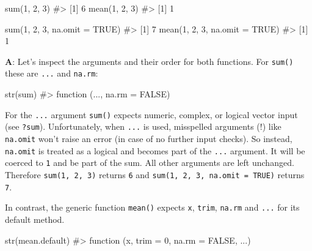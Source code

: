\documentclass[
]{krantz}
\makeatletter
\newenvironment{Shaded}{\begin{snugshade}}{\end{snugshade}}
\newcommand{\CommentTok}[1]{\textcolor[rgb]{0.56,0.35,0.01}{\textit{#1}}}
\newcommand{\DataTypeTok}[1]{\textcolor[rgb]{0.13,0.29,0.53}{#1}}
\newcommand{\DecValTok}[1]{\textcolor[rgb]{0.00,0.00,0.81}{#1}}
\newcommand{\KeywordTok}[1]{\textcolor[rgb]{0.13,0.29,0.53}{\textbf{#1}}}
\newcommand{\NormalTok}[1]{#1}
\newcommand{\OtherTok}[1]{\textcolor[rgb]{0.56,0.35,0.01}{#1}}
\newenvironment{kframe}{%
\medskip{}
\setlength{\fboxsep}{.8em}
 \def\at@end@of@kframe{}%
 \ifinner\ifhmode%
  \def\at@end@of@kframe{\end{minipage}}%
  \begin{minipage}{\columnwidth}%
 \fi\fi%
 \def\FrameCommand##1{\hskip\@totalleftmargin \hskip-\fboxsep
 \colorbox{shadecolor}{##1}\hskip-\fboxsep
     \hskip-\linewidth \hskip-\@totalleftmargin \hskip\columnwidth}%
 \MakeFramed {\advance\hsize-\width
   \@totalleftmargin\z@ \linewidth\hsize
   \@setminipage}}%
 {\par\unskip\endMakeFramed%
 \at@end@of@kframe}
\renewenvironment{Shaded}{\begin{kframe}}{\end{kframe}}
\renewcommand{\KeywordTok} [1]{\textcolor[rgb]{0.00,0.44,0.13}{{#1}}}
\renewcommand{\DataTypeTok}[1]{\textcolor[rgb]{0.56,0.13,0.00}{{#1}}}
\renewcommand{\DecValTok}  [1]{\textcolor[rgb]{0.25,0.63,0.44}{{#1}}}
\renewcommand{\CommentTok} [1]{\textcolor[rgb]{0.38,0.63,0.69}{{#1}}}
\renewcommand{\OtherTok}   [1]{\textcolor[rgb]{0.00,0.44,0.13}{{#1}}}
\renewcommand{\NormalTok}  [1]{{#1}}
\makeatother
\begin{document}
\begin{Shaded}
\begin{Highlighting}[]
\KeywordTok{sum}\NormalTok{(}\DecValTok{1}\NormalTok{, }\DecValTok{2}\NormalTok{, }\DecValTok{3}\NormalTok{)}
\CommentTok{#> [1] 6}
\KeywordTok{mean}\NormalTok{(}\DecValTok{1}\NormalTok{, }\DecValTok{2}\NormalTok{, }\DecValTok{3}\NormalTok{)}
\CommentTok{#> [1] 1}

\KeywordTok{sum}\NormalTok{(}\DecValTok{1}\NormalTok{, }\DecValTok{2}\NormalTok{, }\DecValTok{3}\NormalTok{, }\DataTypeTok{na.omit =} \OtherTok{TRUE}\NormalTok{)}
\CommentTok{#> [1] 7}
\KeywordTok{mean}\NormalTok{(}\DecValTok{1}\NormalTok{, }\DecValTok{2}\NormalTok{, }\DecValTok{3}\NormalTok{, }\DataTypeTok{na.omit =} \OtherTok{TRUE}\NormalTok{)}
\CommentTok{#> [1] 1}
\end{Highlighting}
\end{Shaded}

\textbf{{A}}: Let's inspect the arguments and their order for both functions. For \texttt{sum()} these are \texttt{...} and \texttt{na.rm}:

\begin{Shaded}
\begin{Highlighting}[]
\KeywordTok{str}\NormalTok{(sum)}
\CommentTok{#> function (..., na.rm = FALSE)}
\end{Highlighting}
\end{Shaded}

For the \texttt{...} argument \texttt{sum()} expects numeric, complex, or logical vector input (see \texttt{?sum}). Unfortunately, when \texttt{...} is used, misspelled arguments (!) like \texttt{na.omit} won't raise an error (in case of no further input checks). So instead, \texttt{na.omit} is treated as a logical and becomes part of the \texttt{...} argument. It will be coerced to \texttt{1} and be part of the sum. All other arguments are left unchanged. Therefore \texttt{sum(1,\ 2,\ 3)} returns \texttt{6} and \texttt{sum(1,\ 2,\ 3,\ na.omit\ =\ TRUE)} returns \texttt{7}.

In contrast, the generic function \texttt{mean()} expects \texttt{x}, \texttt{trim}, \texttt{na.rm} and \texttt{...} for its default method.

\begin{Shaded}
\begin{Highlighting}[]
\KeywordTok{str}\NormalTok{(mean.default)}
\CommentTok{#> function (x, trim = 0, na.rm = FALSE, ...)}
\end{Highlighting}
\end{Shaded}
\end{document}
